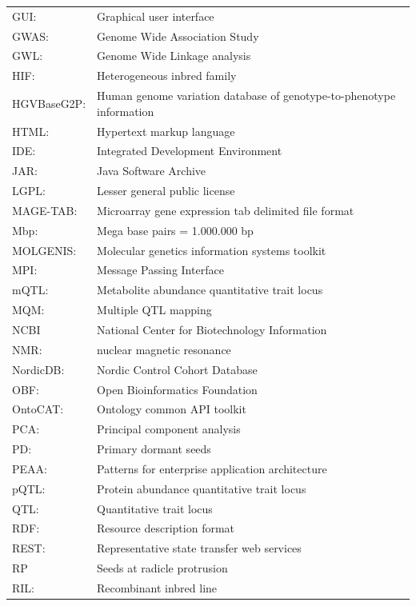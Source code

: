 {\begin{tabular}{ l l }
GUI:         & Graphical user interface\\
GWAS:        & Genome Wide Association Study\\
GWL:         & Genome Wide Linkage analysis\\
HIF:         & Heterogeneous inbred family\\
HGVBaseG2P:  & Human genome variation database of genotype-to-phenotype information\\
HTML:        & Hypertext markup language\\
IDE:         & Integrated Development Environment\\
JAR:         & Java Software Archive\\
LGPL:        & Lesser general public license\\
MAGE-TAB:    & Microarray gene expression tab delimited file format\\
Mbp:         & Mega base pairs = 1.000.000 bp \\
MOLGENIS:    & Molecular genetics information systems toolkit\\
MPI:         & Message Passing Interface\\
mQTL:        & Metabolite abundance quantitative trait locus\\
MQM:         & Multiple QTL mapping\\
NCBI         & National Center for Biotechnology Information\\
NMR:         & nuclear magnetic resonance\\
NordicDB:    & Nordic Control Cohort Database\\
OBF:         & Open Bioinformatics Foundation\\
OntoCAT:     & Ontology common API toolkit\\
PCA:         & Principal component analysis\\
PD:          & Primary dormant seeds\\
PEAA:        & Patterns for enterprise application architecture\\
pQTL:        & Protein abundance quantitative trait locus\\
QTL:         & Quantitative trait locus\\
RDF:         & Resource description format\\
REST:        & Representative state transfer web services\\
RP           & Seeds at radicle protrusion\\
RIL:         & Recombinant inbred line \\

\end{tabular}}
